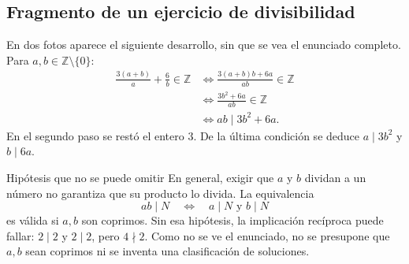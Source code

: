 \subsection{Fragmento de un ejercicio de divisibilidad}
En dos fotos aparece el siguiente desarrollo, sin que se vea el enunciado completo. Para $a,b\in\mathbb Z\setminus\{0\}$:
\begin{align*}
\frac{3(a+b)}{a}+\frac6b\in\mathbb Z
&\Longleftrightarrow\frac{3(a+b)b+6a}{ab}\in\mathbb Z\\
&\Longleftrightarrow\frac{3b^2+6a}{ab}\in\mathbb Z\\
&\Longleftrightarrow ab\mid3b^2+6a.
\end{align*}
En el segundo paso se restó el entero $3$. De la última condición se deduce $a\mid3b^2$ y $b\mid6a$.
\begin{nota}{Hipótesis que no se puede omitir}
En general, exigir que $a$ y $b$ dividan a un número no garantiza que su producto lo divida. La equivalencia
\[
ab\mid N\quad\Longleftrightarrow\quad a\mid N\text{ y }b\mid N
\]
es válida si $a,b$ son coprimos. Sin esa hipótesis, la implicación recíproca puede fallar: $2\mid2$ y $2\mid2$, pero $4\nmid2$. Como no se ve el enunciado, no se presupone que $a,b$ sean coprimos ni se inventa una clasificación de soluciones.
\end{nota}
